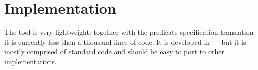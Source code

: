 
\section{Implementation}
\label{sec:impl}

The \plqc{} tool is very lightweight: \plqc{} together with the predicate
specification translation it is currently less then a thousand lines
of \Prolog{} code.
%
It is developed in \Yap~\Prolog{}~\cite{yap} but it is mostly comprised of
standard \Prolog{} code and should be easy to port to other
implementations.


%
%


